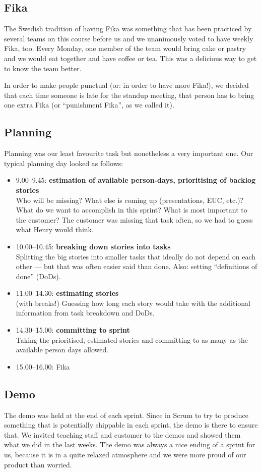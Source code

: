 \documentclass[11pt,a4paper]{report}
\begin{document}
\subsection{Fika}
The Swedish tradition of having Fika was something that has been practiced by
several teams on this course before us and we unanimously voted to have weekly
Fika, too. Every Monday, one member of the team would bring cake or pastry and
we would eat together and have coffee or tea. This was a delicious way to get to
know the team better.

In order to make people punctual (or: in order to have more Fika!), we decided
that each time someone is late for the standup meeting, that person has to
bring one extra Fika (or ``punishment Fika'', as we called it).
\subsection{Planning}
Planning was our least favourite task but nonetheless a very important one.
Our typical planning day looked as follows:
\begin{itemize}
\item 9.00--9.45: {\bf estimation of available person-days,
  prioritising of backlog stories}\\
  Who will be missing? What else is coming up (presentations, EUC, etc.)?
  What do we want to accomplish in this sprint?
  What is most important to the customer? The customer was missing that task
  often, so we had to guess what Henry would think.
\item 10.00--10.45: {\bf breaking down stories into tasks}\\
  Splitting the big stories into smaller tasks that ideally do not depend on
  each other --- but that was often easier said than done.
  Also: setting ``definitions of done'' (DoDs).
\item 11.00--14.30: {\bf estimating stories}\\
  (with breaks!)
  Guessing how long each story would take with the additional information from
  task breakdown and DoDs.
\item 14.30--15.00: {\bf committing to sprint}\\
  Taking the prioritised, estimated stories and committing to as many as the
  available person days allowed.
\item 15.00--16.00: Fika
\end{itemize}

\subsection{Demo}
The demo was held at the end of each sprint. Since in Scrum to try to produce
something that is potentially shippable in each sprint, the demo is there to
ensure that. We invited teaching staff and customer to the demos and showed them
what we did in the last weeks. The demo was always a nice ending of a sprint for
us, because it is in a quite relaxed atmosphere and we were more proud of our
product than worried.
\end{document}
